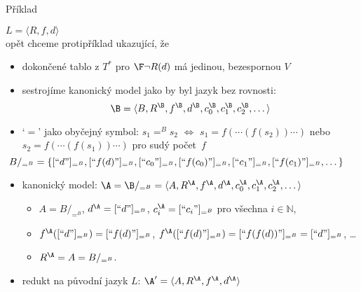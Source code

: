 \documentclass{beamer}
\begin{document}
\begin{frame}{Příklad}

    \pause
     $L=\langle R,f,d \rangle$ \\ opět chceme protipříklad ukazující, že 

    \pause
    \begin{itemize}
        \item dokončené tablo \alert{z $T^*$} pro $\F\neg R(d)$ má jedinou, bezespornou $V$\pause
        \item sestrojíme kanonický model jako by byl jazyk bez rovnosti:\pause
        $$
        \B=\langle B,R^\B,f^\B,d^\B,c_0^\B,c_1^\B,c_2^\B,\dots\rangle
        $$

        \pause
        \item \alert{`$=$' jako obyčejný symbol:} \pause $s_1=^B s_2$ $\Leftrightarrow$ $s_1=f(\cdots (f(s_2))\cdots)$ nebo \small$s_2=f(\cdots (f(s_1))\cdots)$ pro sudý počet~$f$ \pause  
        $$\hspace{-1cm}
        B/_{=^B} = \{[\text{``$d$''}]_{=^B},[\text{``$f(d)$''}]_{=^B},[\text{``$c_0$''}]_{=^B},[\text{``$f(c_0)$''}]_{=^B},[\text{``$c_1$''}]_{=^B},[\text{``$f(c_1)$''}]_{=^B},\dots\}
        $$    

        \pause
        \item \alert{kanonický model}: 
        $\A=\B/_{=^B}=\langle A,R^\A,f^\A,d^\A,c_0^\A,c_1^\A,c_2^\A,\dots\rangle$\pause
        \begin{itemize}
            \item $A=B/_{=^B}$, $d^\A=[\text{``$d$''}]_{=^B}$, $c^\A_i=[\text{``$c_i$''}]_{=^B}$ pro všechna $i\in \mathbb N$,\pause
            \item $f^\A([\text{``$d$''}]_{=^B})=[\text{``$f(d)$''}]_{=^B}$, $f^\A([\text{``$f(d)$''}]_{=^B})=[\text{``$f(f(d))$''}]_{=^B}=[\text{``$d$''}]_{=^B}$, \dots\pause
            \item $R^\A=A=B/_{=^B}$.\pause
        \end{itemize}        
        \item redukt na původní jazyk $L$: $\A'=\langle A, R^\A, f^\A, d^\A\rangle$
    \end{itemize}

\end{frame}
\end{document}
